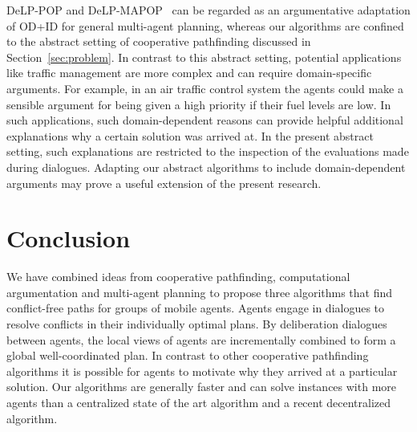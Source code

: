 \textsf{DeLP-POP} and \textsf{DeLP-MAPOP}~\cite{pardo2011,ferrando2012} can be regarded as an argumentative adaptation of OD+ID for general multi-agent planning, whereas our algorithms are confined to the abstract setting of cooperative pathfinding discussed in Section~\ref{sec:problem}.
%
In contrast to this abstract setting, potential applications like traffic management are more complex and 
can require domain-specific arguments. For example, in an air traffic control 
system the agents could make a sensible argument for being given a high priority if their fuel 
levels are low.
In such applications, such domain-dependent reasons can provide helpful additional explanations why a certain solution was 
arrived at. In the present abstract setting, such explanations are restricted to the inspection of the evaluations 
made during dialogues. Adapting our abstract algorithms to include domain-dependent arguments may prove a useful extension of the present research.

\section{Conclusion}
We have combined ideas from cooperative pathfinding, computational 
argumentation and multi-agent planning to propose three algorithms that find 
conflict-free paths for groups of mobile agents. Agents engage in 
dialogues to resolve conflicts in their individually optimal plans. By 
deliberation dialogues between agents, the local views of 
agents are incrementally combined to form a global well-coordinated plan.
In contrast to other cooperative pathfinding algorithms it is possible for 
agents to motivate why they arrived at a particular solution.
Our algorithms are generally faster and can solve instances with more agents than a 
centralized state of the art algorithm and a recent decentralized algorithm.
